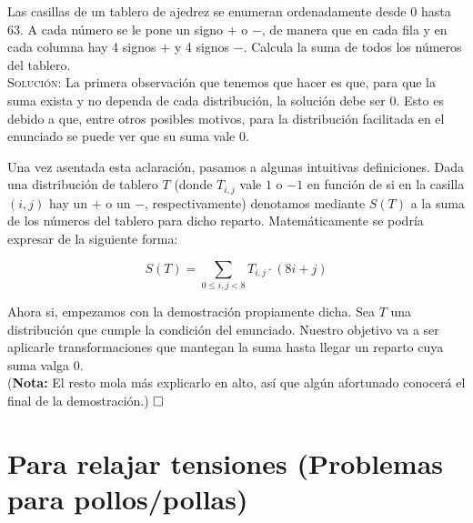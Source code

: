 \documentclass{article}
\begin{document}
Las casillas de un tablero de ajedrez se enumeran ordenadamente desde 0 hasta 63. A cada número se le pone un signo $+$ o $-$, de manera que en cada fila y en cada columna hay 4 signos $+$ y 4 signos $-$. Calcula la suma de todos los números del tablero. \\

\noindent\textsc{Solución:} La primera observación que tenemos que hacer es que, para que la suma exista y no dependa de cada distribución, la solución debe ser $0$. Esto es debido a que, entre otros posibles motivos, para la distribución facilitada en el enunciado se puede ver que su suma vale $0$.

Una vez asentada esta aclaración, pasamos a algunas intuitivas definiciones. Dada una distribución de tablero $T$ (donde $T_{i,j}$ vale $1$ o $-1$ en función de si en la casilla $(i, j)$ hay un $+$ o un $-$, respectivamente) denotamos mediante $S(T)$ a la suma de los números del tablero para dicho reparto. Matemáticamente se podría expresar de la siguiente forma:

\[S(T) = \sum_{0 \leq i,j < 8} T_{i,j} \cdot (8i + j)\]

Ahora si, empezamos con la demostración propiamente dicha. Sea $T$ una distribución que cumple la condición del enunciado. Nuestro objetivo va a ser aplicarle transformaciones que mantegan la suma hasta llegar un reparto cuya suma valga $0$. \\

\noindent (\textbf{Nota:} El resto mola más explicarlo en alto, así que algún afortunado conocerá el final de la demostración.) $\hfill\square$

\newpage

\section{Para relajar tensiones (Problemas para pollos/pollas)}
\end{document}
